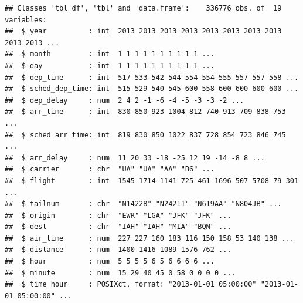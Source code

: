 \documentclass[]{scrbook}
\newenvironment{Shaded}{\begin{snugshade}}{\end{snugshade}}
\newcommand{\CommentTok}[1]{\textcolor[rgb]{0.56,0.35,0.01}{\textit{#1}}}
\newcommand{\DataTypeTok}[1]{\textcolor[rgb]{0.13,0.29,0.53}{#1}}
\newcommand{\DecValTok}[1]{\textcolor[rgb]{0.00,0.00,0.81}{#1}}
\newcommand{\KeywordTok}[1]{\textcolor[rgb]{0.13,0.29,0.53}{\textbf{#1}}}
\newcommand{\NormalTok}[1]{#1}
\newcommand{\OperatorTok}[1]{\textcolor[rgb]{0.81,0.36,0.00}{\textbf{#1}}}
\newcommand{\StringTok}[1]{\textcolor[rgb]{0.31,0.60,0.02}{#1}}
\renewenvironment{Shaded} {\begin{snugshade}\small} {\end{snugshade}}
\begin{document}
\begin{verbatim}
## Classes 'tbl_df', 'tbl' and 'data.frame':    336776 obs. of  19 variables:
##  $ year          : int  2013 2013 2013 2013 2013 2013 2013 2013 2013 2013 ...
##  $ month         : int  1 1 1 1 1 1 1 1 1 1 ...
##  $ day           : int  1 1 1 1 1 1 1 1 1 1 ...
##  $ dep_time      : int  517 533 542 544 554 554 555 557 557 558 ...
##  $ sched_dep_time: int  515 529 540 545 600 558 600 600 600 600 ...
##  $ dep_delay     : num  2 4 2 -1 -6 -4 -5 -3 -3 -2 ...
##  $ arr_time      : int  830 850 923 1004 812 740 913 709 838 753 ...
##  $ sched_arr_time: int  819 830 850 1022 837 728 854 723 846 745 ...
##  $ arr_delay     : num  11 20 33 -18 -25 12 19 -14 -8 8 ...
##  $ carrier       : chr  "UA" "UA" "AA" "B6" ...
##  $ flight        : int  1545 1714 1141 725 461 1696 507 5708 79 301 ...
##  $ tailnum       : chr  "N14228" "N24211" "N619AA" "N804JB" ...
##  $ origin        : chr  "EWR" "LGA" "JFK" "JFK" ...
##  $ dest          : chr  "IAH" "IAH" "MIA" "BQN" ...
##  $ air_time      : num  227 227 160 183 116 150 158 53 140 138 ...
##  $ distance      : num  1400 1416 1089 1576 762 ...
##  $ hour          : num  5 5 5 5 6 5 6 6 6 6 ...
##  $ minute        : num  15 29 40 45 0 58 0 0 0 0 ...
##  $ time_hour     : POSIXct, format: "2013-01-01 05:00:00" "2013-01-01 05:00:00" ...
\end{verbatim}

\begin{Shaded}
\end{Shaded}
\end{document}
